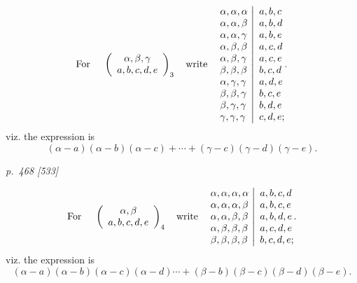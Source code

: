 \documentclass[11pt,a4paper]{article}
\makeatletter
\theoremstyle{plain}
\theoremstyle{definition}
\newcommand{\twocol}[2]{%
  \left.
  \begin{array}{@{}l@{}}
    #1
  \end{array}
  \ \right|\
  \begin{array}{@{}l@{}}
    #2
  \end{array}}
\makeatother
\begin{document}
\[
\text{For }\quad
\left(\begin{array}{c}
\alpha,\beta,\gamma\\
a,b,c,d,e
\end{array}\right)_{3}
\quad\text{write}\quad
\twocol{
\alpha,\alpha,\alpha\\
\alpha,\alpha,\beta\\
\alpha,\alpha,\gamma\\
\alpha,\beta,\beta\\
\alpha,\beta,\gamma\\
\beta,\beta,\beta\\
\alpha,\gamma,\gamma\\
\beta,\beta,\gamma\\
\beta,\gamma,\gamma\\
\gamma,\gamma,\gamma
}{
a,b,c\\
a,b,d\\
a,b,e\\
a,c,d\\
a,c,e\\
b,c,d\\
a,d,e\\
b,c,e\\
b,d,e\\
c,d,e;
}.
\]
viz. the expression is
\[
(\alpha-a)(\alpha-b)(\alpha-c)+\cdots+(\gamma-c)(\gamma-d)(\gamma-e).
\]

\clearpage

\bigskip
\textit{p.~468 [533]}
\smallskip

\noindent

\[
\text{For }\quad
\left(\begin{array}{c}
\alpha,\beta\\
a,b,c,d,e
\end{array}\right)_{4}
\quad\text{write}\quad
\twocol{
\alpha,\alpha,\alpha,\alpha\\
\alpha,\alpha,\alpha,\beta\\
\alpha,\alpha,\beta,\beta\\
\alpha,\beta,\beta,\beta\\
\beta,\beta,\beta,\beta
}{
a,b,c,d\\
a,b,c,e\\
a,b,d,e\\
a,c,d,e\\
b,c,d,e;
}.
\]
viz. the expression is
\[
(\alpha-a)(\alpha-b)(\alpha-c)(\alpha-d)\cdots
+(\beta-b)(\beta-c)(\beta-d)(\beta-e).
\]
\end{document}
